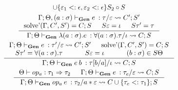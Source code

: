 \documentclass[declaration,shortabstract]{iithesis}
\newcommand{\gens}[6][\Gamma;\Theta]{\ensuremath{{{#1} \vdash_\textbf{Gen} {#2} \: : {#3}/{#4}} \rightsquigarrow {#5};{#6}}}
\begin{document}
\begin{gather*}
\begin{gathered}
{{    \cup \{ \varepsilon_1 <: \epsilon, \varepsilon_2 <: \epsilon\}}{S_2 \circ S}
}
\\
\inference{
    \gens[\Gamma; \Theta, (a : \sigma)]{e}{\tau}{\varepsilon}{C'}{S'} \\
    \operatorname{solve'}(\Gamma, C', S') = C; S &
    S \varepsilon = \iota &
    S \tau' = \tau
}{
    \gens{\lambda (a : \sigma). e}{\forall (a : \sigma) . \tau}{\iota}{C}{S}
}
\\
\inference{
    \gens{e}{\tau'}{\varepsilon}{C'}{S'} &
    \operatorname{solve'}(\Gamma, C', S') = C; S  \\
    S \tau' = \forall (a : \sigma) . \tau &
    S \varepsilon = \iota &
    (b:\sigma) \in S\Theta
}{
    \gens{e\:b}{\tau[b/a]}{\iota}{C}{S}
}
\\
\inference{
    \Theta \vdash op_a : \tau_1 \Rightarrow \tau_2 &
    \gens{e}{\tau_e}{\varepsilon}{C}{S}
}{
    \gens{op_a \: e}{\tau_2}{a * \varepsilon}{C \cup \{\tau_e <: \tau_1 \}}{S}
}\end{gathered}
\end{gather*}
\end{document}
